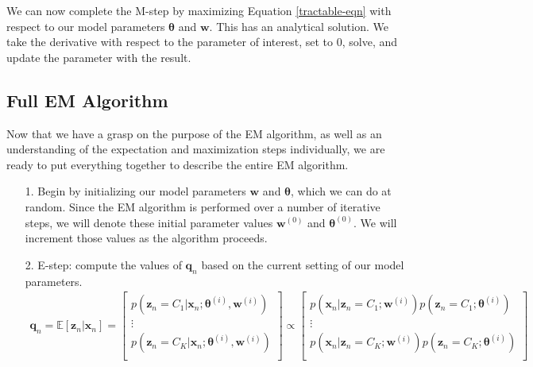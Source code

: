 We can now complete the M-step by maximizing Equation \ref{tractable-eqn} with respect to our model parameters $\boldsymbol{\theta}$ and $\textbf{w}$. This has an analytical solution. We take the derivative with respect to the parameter of interest, set to 0, solve, and update the parameter with the result.

\subsection{Full EM Algorithm}\label{sec:full-em}

Now that we have a grasp on the purpose of the EM algorithm, as well as an understanding of the expectation and maximization steps individually, we are ready to put everything together to describe the entire EM algorithm.

\begin{itemize}
    \item[1.] Begin by initializing our model parameters $\textbf{w}$ and $\boldsymbol{\theta}$, which we can do at random. Since the EM algorithm is performed over a number of iterative steps, we will denote these initial parameter values $\textbf{w}^{(0)}$ and $\boldsymbol{\theta}^{(0)}$. We will increment those values as the algorithm proceeds.
    \item[2.] E-step: compute the values of $\textbf{q}_n$ based on the current setting of our model parameters.
    \begin{align*}
        \textbf{q}_n = \mathbb{E}[\textbf{z}_n | \textbf{x}_n] = \begin{bmatrix}
                p(\textbf{z}_n = C_1 | \textbf{x}_n; \boldsymbol{\theta}^{(i)}, \textbf{w}^{(i)}) \\
                \vdots \\
                p(\textbf{z}_n = C_K | \textbf{x}_n; \boldsymbol{\theta}^{(i)}, \textbf{w}^{(i)}) \\
            \end{bmatrix} 
            \propto \begin{bmatrix}
            p(\textbf{x}_n | \textbf{z}_n = C_1; \textbf{w}^{(i)})p(\textbf{z}_n = C_1; \boldsymbol{\theta}^{(i)}) \\
            \vdots \\
            p(\textbf{x}_n | \textbf{z}_n = C_K; \textbf{w}^{(i)})p(\textbf{z}_n = C_K; \boldsymbol{\theta}^{(i)}) \\
        \end{bmatrix} \\

\end{align*}
\end{itemize}
